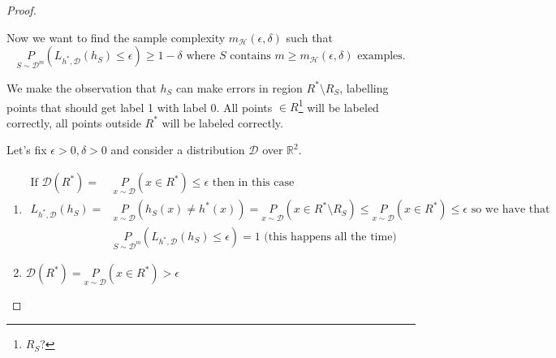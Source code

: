 \documentclass{article}
\newcommand{\<}{\langle}
\renewcommand{\>}{\rangle}
\theoremstyle{definition}
\def\gD{{\mathcal{D}}}
\def\gH{{\mathcal{H}}}
\def\sR{{\mathbb{R}}}
\newcommand{\uset}{\underset}
\newcommand{\epd}{(\epsilon, \delta)}
\newcommand{\mgh}{m_{\gH}}
\newcommand{\psdm}{\uset{S \sim \gD^m}{P}}
\newcommand{\hs}{h_S}
\newcommand{\hsx}{h_S(x)}
\newcommand{\sRs}{\sR^2}
\newcommand{\uset}{\underset}
\newcommand{\epd}{(\epsilon, \delta)}
\newcommand{\mgh}{m_{\gH}}
\newcommand{\psdm}{\uset{S \sim \gD^m}{P}}
\newcommand{\hs}{h_S}
\newcommand{\hsx}{h_S(x)}
\newcommand{\sRs}{\sR^2}
\begin{document}
\begin{proof}
\begin{figure}[h]
\end{figure}

Now we want to find the sample complexity $\mgh\epd$ such that
\begin{equation*}
\uset{S \sim {\gD}^m}{P} (L_{h^*, \gD}(\hs) \leq \epsilon) \geq 1-\delta \text{ where } S
\text{ contains } m \geq \mgh\epd \text{ examples.}
\end{equation*}

We make the observation that $\hs$ can make errors in region $R^* \setminus R_S$, labelling
points that should get label 1 with label 0. All points $\in R$\footnote{$R_S$?} will be labeled correctly,
all points outside $R^*$ will be labeled correctly.

Let's fix $\epsilon > 0, \delta > 0$ and consider a distribution $\gD$ over $\sRs$.

\begin{enumerate}[itemindent=0.5cm,label=Case \arabic*)]
  \item
  \begin{align*}
    \text{If }\gD(R^*) =& \uset{x \sim \gD}{P}(x \in R^*) \leq \epsilon
      \text{ then in this case} \\
    L_{h^*, \gD}(\hs)  =& \uset{x \sim \gD}{P}(\hsx \neq h^*(x)) =
      \uset{x \sim \gD}{P}(x \in R^* \setminus R_S) \leq
      \uset{x \sim \gD}{P}(x \in R^*) \leq \epsilon \text{ so we have that} \\
    &\psdm(L_{h^*, \gD}(\hs) \leq \epsilon) = 1
      \text{ (this happens all the time)}
  \end{align*}

  \item $\gD(R^*) = \uset{x \sim \gD}{P}(x \in R^*) > \epsilon$
    
    \begin{figure}[h]
\end{figure}
\end{enumerate}
\end{proof}
\end{document}
